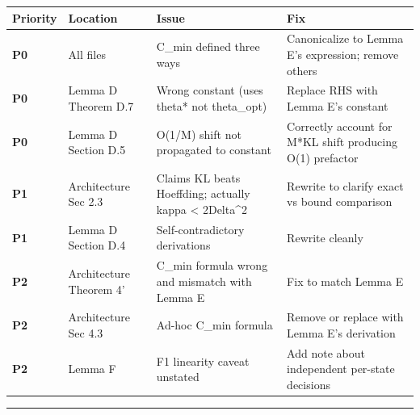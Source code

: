 \documentclass[
  12pt,
]{article}
\begin{document}
\begin{longtable}[]{@{}
  >{\raggedright\arraybackslash}p{}
  >{\raggedright\arraybackslash}p{}
  >{\raggedright\arraybackslash}p{}
  >{\raggedright\arraybackslash}p{}@{}}
\toprule\noalign{}
\begin{minipage}[b]{\linewidth}\raggedright
Priority
\end{minipage} & \begin{minipage}[b]{\linewidth}\raggedright
Location
\end{minipage} & \begin{minipage}[b]{\linewidth}\raggedright
Issue
\end{minipage} & \begin{minipage}[b]{\linewidth}\raggedright
Fix
\end{minipage} \\
\midrule\noalign{}
\endhead
\bottomrule\noalign{}
\endlastfoot
\textbf{P0} & All files & C\_min defined three ways & Canonicalize to
Lemma E's expression; remove others \\
\textbf{P0} & Lemma D Theorem D.7 & Wrong constant (uses theta* not
theta\_opt) & Replace RHS with Lemma E's constant \\
\textbf{P0} & Lemma D Section D.5 & O(1/M) shift not propagated to
constant & Correctly account for M*KL shift producing O(1) prefactor \\
\textbf{P1} & Architecture Sec 2.3 & Claims KL beats Hoeffding; actually
kappa \textless{} 2Delta\^{}2 & Rewrite to clarify exact vs bound
comparison \\
\textbf{P1} & Lemma D Section D.4 & Self-contradictory derivations &
Rewrite cleanly \\
\textbf{P2} & Architecture Theorem 4' & C\_min formula wrong and
mismatch with Lemma E & Fix to match Lemma E \\
\textbf{P2} & Architecture Sec 4.3 & Ad-hoc C\_min formula & Remove or
replace with Lemma E's derivation \\
\textbf{P2} & Lemma F & F1 linearity caveat unstated & Add note about
independent per-state decisions \\
\end{longtable}

\begin{center}\rule{0.5\linewidth}{0.5pt}\end{center}
\end{document}
